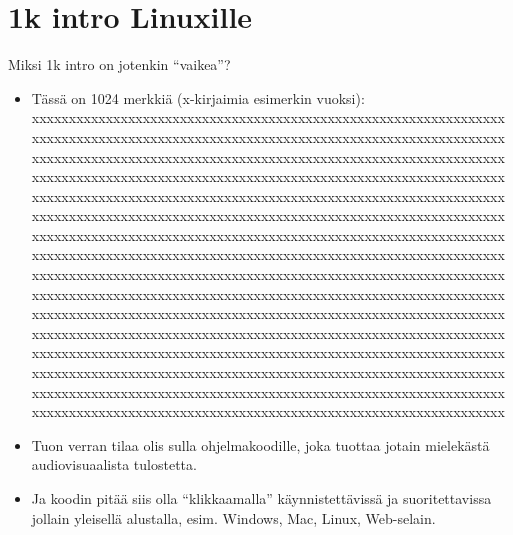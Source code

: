 \documentclass[pdf,10pt,handout]{beamer}
\begin{document}
\section{1k intro Linuxille}
\begin{frame}{Miksi 1k intro on jotenkin ``vaikea''?}
  \begin{itemize}
  \item Tässä on 1024 merkkiä (x-kirjaimia esimerkin vuoksi):{\footnotesize \\
    xxxxxxxxxxxxxxxxxxxxxxxxxxxxxxxxxxxxxxxxxxxxxxxxxxxxxxxxxxxxxxxx\\%
    xxxxxxxxxxxxxxxxxxxxxxxxxxxxxxxxxxxxxxxxxxxxxxxxxxxxxxxxxxxxxxxx\\%
    xxxxxxxxxxxxxxxxxxxxxxxxxxxxxxxxxxxxxxxxxxxxxxxxxxxxxxxxxxxxxxxx\\%
    xxxxxxxxxxxxxxxxxxxxxxxxxxxxxxxxxxxxxxxxxxxxxxxxxxxxxxxxxxxxxxxx\\%
    xxxxxxxxxxxxxxxxxxxxxxxxxxxxxxxxxxxxxxxxxxxxxxxxxxxxxxxxxxxxxxxx\\%
    xxxxxxxxxxxxxxxxxxxxxxxxxxxxxxxxxxxxxxxxxxxxxxxxxxxxxxxxxxxxxxxx\\%
    xxxxxxxxxxxxxxxxxxxxxxxxxxxxxxxxxxxxxxxxxxxxxxxxxxxxxxxxxxxxxxxx\\%
    xxxxxxxxxxxxxxxxxxxxxxxxxxxxxxxxxxxxxxxxxxxxxxxxxxxxxxxxxxxxxxxx\\%
    xxxxxxxxxxxxxxxxxxxxxxxxxxxxxxxxxxxxxxxxxxxxxxxxxxxxxxxxxxxxxxxx\\%
    xxxxxxxxxxxxxxxxxxxxxxxxxxxxxxxxxxxxxxxxxxxxxxxxxxxxxxxxxxxxxxxx\\%
    xxxxxxxxxxxxxxxxxxxxxxxxxxxxxxxxxxxxxxxxxxxxxxxxxxxxxxxxxxxxxxxx\\%
    xxxxxxxxxxxxxxxxxxxxxxxxxxxxxxxxxxxxxxxxxxxxxxxxxxxxxxxxxxxxxxxx\\%
    xxxxxxxxxxxxxxxxxxxxxxxxxxxxxxxxxxxxxxxxxxxxxxxxxxxxxxxxxxxxxxxx\\%
    xxxxxxxxxxxxxxxxxxxxxxxxxxxxxxxxxxxxxxxxxxxxxxxxxxxxxxxxxxxxxxxx\\%
    xxxxxxxxxxxxxxxxxxxxxxxxxxxxxxxxxxxxxxxxxxxxxxxxxxxxxxxxxxxxxxxx\\%
    xxxxxxxxxxxxxxxxxxxxxxxxxxxxxxxxxxxxxxxxxxxxxxxxxxxxxxxxxxxxxxxx\\%
}
    \item Tuon verran tilaa olis sulla ohjelmakoodille, joka tuottaa
      jotain mielekästä audiovisuaalista tulostetta.
    \item Ja koodin pitää siis olla ``klikkaamalla'' käynnistettävissä
      ja suoritettavissa jollain yleisellä alustalla, esim. Windows,
      Mac, Linux, Web-selain.
  \end{itemize}
\end{frame}
\end{document}
